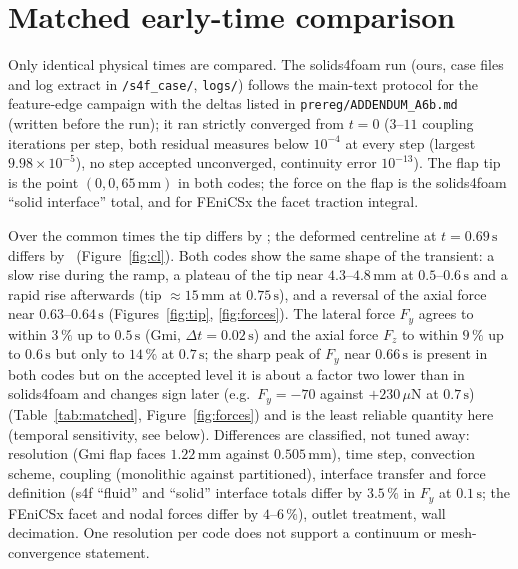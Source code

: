 \documentclass[sn-mathphys,Numbered]{sn-jnl}
\newcommand{\data}{\detokenize{paper-data/fenicsx_hessenthaler}}
\begin{document}
\section{Matched early-time comparison}\label{sec:matched}
Only identical physical times are compared. The solids4foam run (ours, case files and log extract in \texttt{\data/s4f\_case/}, \texttt{logs/}) follows the main-text protocol for the feature-edge campaign with the deltas listed in \texttt{prereg/ADDENDUM\_A6b.md} (written before the run); it ran strictly converged from $t=0$ ($3$--$11$ coupling iterations per step, both residual measures below $10^{-4}$ at every step (largest $9.98\times10^{-5}$), no step accepted unconverged, continuity error $10^{-13}$). The flap tip is the point $(0,0,65\,\mathrm{mm})$ in both codes; the force on the flap is the solids4foam ``solid interface'' total, and for FEniCSx the facet traction integral.
\begin{table}[htbp]\centering\caption{Matched physical times. Tip $y$ displacement and force components on the flap (fluid acting on the flap). FE Gmi: dt $0.02\,\mathrm{s}$ ($0.01\,\mathrm{s}$ from $0.69\,\mathrm{s}$); s4f: dt $0.002\,\mathrm{s}$, our reconstruction.}\label{tab:matched}\scriptsize\setlength{\tabcolsep}{3pt}\matchedtable\end{table}
Over the common times the tip differs by \tipstats; the deformed centreline at $t=0.69\,\mathrm{s}$ differs by \clstats\ (Figure~\ref{fig:cl}). Both codes show the same shape of the transient: a slow rise during the ramp, a plateau of the tip near $4.3$--$4.8\,\mathrm{mm}$ at $0.5$--$0.6\,\mathrm{s}$ and a rapid rise afterwards (tip $\approx15\,\mathrm{mm}$ at $0.75\,\mathrm{s}$), and a reversal of the axial force near $0.63$--$0.64\,\mathrm{s}$ (Figures~\ref{fig:tip}, \ref{fig:forces}). The lateral force $F_y$ agrees to within $3\,\%$ up to $0.5\,\mathrm{s}$ (Gmi, $\Delta t=0.02\,\mathrm{s}$) and the axial force $F_z$ to within $9\,\%$ up to $0.6\,\mathrm{s}$ but only to $14\,\%$ at $0.7\,\mathrm{s}$; the sharp peak of $F_y$ near $0.66\,\mathrm{s}$ is present in both codes but on the accepted level it is about a factor two lower than in solids4foam and changes sign later (e.g.\ $F_y=-70$ against $+230\,\mu$N at $0.7\,\mathrm{s}$) (Table~\ref{tab:matched}, Figure~\ref{fig:forces}) and is the least reliable quantity here (temporal sensitivity, see below). Differences are classified, not tuned away: resolution (Gmi flap faces $1.22\,\mathrm{mm}$ against $0.505\,\mathrm{mm}$), time step, convection scheme, coupling (monolithic against partitioned), interface transfer and force definition (s4f ``fluid'' and ``solid'' interface totals differ by $3.5\,\%$ in $F_y$ at $0.1\,\mathrm{s}$; the FEniCSx facet and nodal forces differ by $4$--$6\,\%$), outlet treatment, wall decimation. One resolution per code does not support a continuum or mesh-convergence statement. 
\end{document}

